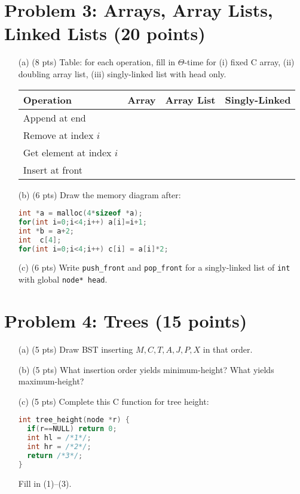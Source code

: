 \documentclass[12pt]{article}
\begin{document}
\section*{Problem 3: Arrays, Array Lists, Linked Lists (20 points)}
\begin{enumerate}
  \item[(a)] (8 pts) Table: for each operation, fill in \(\Theta\)-time for (i) fixed C array, (ii) doubling array list, (iii) singly-linked list with head only.\\
  \begin{tabular}{l|c|c|c}
    Operation               & Array & Array List & Singly-Linked \\
    \hline
    Append at end           &       &            &               \\
    Remove at index \(i\)   &       &            &               \\
    Get element at index \(i\)&    &            &               \\
    Insert at front         &       &            &               \\
  \end{tabular}

  \item[(b)] (6 pts) Draw the memory diagram after:
  \begin{lstlisting}[language=C]
int *a = malloc(4*sizeof *a);
for(int i=0;i<4;i++) a[i]=i+1;
int *b = a+2;
int  c[4];
for(int i=0;i<4;i++) c[i] = a[i]*2;
  \end{lstlisting}

  \item[(c)] (6 pts) Write \texttt{push\_front} and \texttt{pop\_front} for a singly-linked list of \texttt{int} with global \texttt{node* head}.
\end{enumerate}

\section*{Problem 4: Trees (15 points)}
\begin{enumerate}
  \item[(a)] (5 pts) Draw BST inserting \(M, C, T, A, J, P, X\) in that order.
  \item[(b)] (5 pts) What insertion order yields minimum-height? What yields maximum-height?
  \item[(c)] (5 pts) Complete this C function for tree height:
  \begin{lstlisting}[language=C]
int tree_height(node *r) {
  if(r==NULL) return 0;
  int hl = /*1*/;
  int hr = /*2*/;
  return /*3*/;
}
  \end{lstlisting}
  Fill in (1)--(3).
\end{enumerate}
\end{document}

